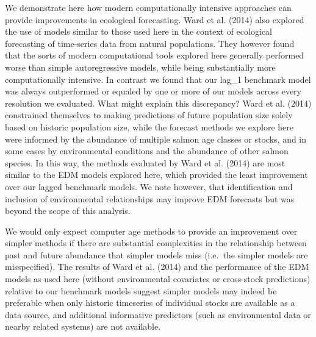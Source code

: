 \documentclass[
]{article}
\begin{document}
We demonstrate here how modern computationally intensive approaches can provide improvements in ecological forecasting. Ward et al. (2014) also explored the use of models similar to those used here in the context of ecological forecasting of time-series data from natural populations. They however found that the sorts of modern computational tools explored here generally performed worse than simple autoregressive models, while being substantially more computationally intensive. In contrast we found that our lag\_1 benchmark model was always outperformed or equaled by one or more of our models across every resolution we evaluated. What might explain this discrepancy? Ward et al. (2014) constrained themselves to making predictions of future population size solely based on historic population size, while the forecast methods we explore here were informed by the abundance of multiple salmon age classes or stocks, and in some cases by environmental conditions and the abundance of other salmon species. In this way, the methods evaluated by Ward et al. (2014) are most similar to the EDM models explored here, which provided the least improvement over our lagged benchmark models. We note however, that identification and inclusion of environmental relationships may improve EDM forecasts but was beyond the scope of this analysis.

We would only expect computer age methods to provide an improvement over simpler methods if there are substantial complexities in the relationship between past and future abundance that simpler models miss (i.e.~the simpler models are misspecified). The results of Ward et al. (2014) and the performance of the EDM models as used here (without environmental covariates or cross-stock predictions) relative to our benchmark models suggest simpler models may indeed be preferable when only historic timeseries of individual stocks are available as a data source, and additional informative predictors (such as environmental data or nearby related systems) are not available.
\end{document}
